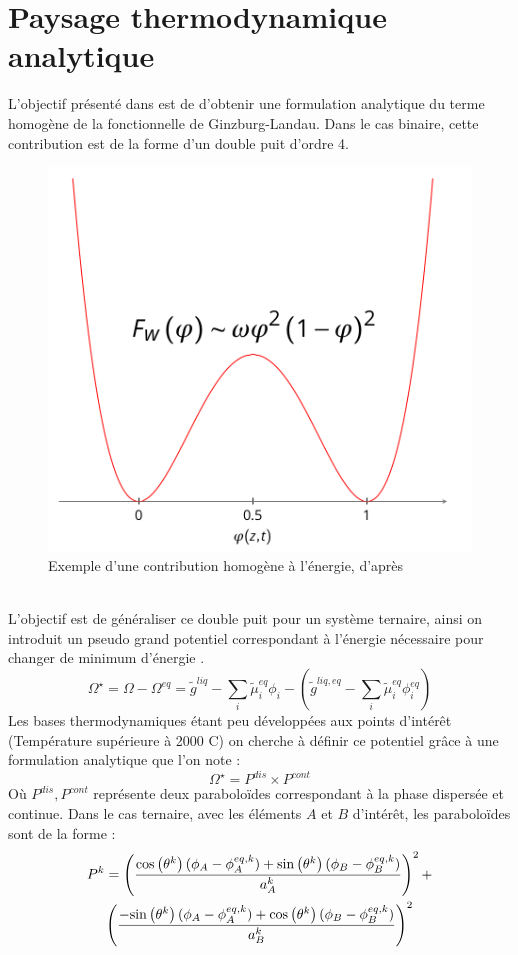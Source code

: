 \section{Paysage thermodynamique analytique}
L'objectif présenté dans \cite{noauthor_numerical_nodate} est de d'obtenir une formulation analytique du terme homogène de la fonctionnelle de Ginzburg-Landau. Dans le cas binaire, cette contribution est de la forme d'un double puit d'ordre 4.
\begin{figure}[h!]
	\centering
	\includegraphics[width=0.4\linewidth]{figure/DP}
	\caption[Exemple d'une contribution homogène à l'énergie]{Exemple d'une contribution homogène à l'énergie, d'après \cite{introini_suivi_nodate}}
	\label{fig:dp}
\end{figure}\\
L'objectif est de généraliser ce double puit pour un système ternaire, ainsi on introduit un pseudo grand potentiel correspondant à l'énergie nécessaire pour changer de minimum d'énergie \cite{cardon_modelisation_2016}.
\begin{equation}
\Omega^{\star} =\Omega - \Omega^{eq} =  \tilde{g}^{liq} - \sum_i \tilde{\mu}_i^{eq}\phi_i - \left(  \tilde{g}^{liq,eq} -  \sum_i \tilde{\mu}_i^{eq}\phi_i^{eq} \right) 
\end{equation}
Les bases thermodynamiques étant peu développées aux points d'intérêt (Température supérieure à 2000 \textdegree C) on cherche à définir ce potentiel grâce à une formulation analytique que l'on note :
\begin{equation}\label{double_puit}
	\Omega^{\star}  = P^{dis} \times P^{cont}
\end{equation}
Où $P^{dis}, P^{cont}$ représente deux paraboloïdes correspondant à la phase dispersée et continue. Dans le cas ternaire, avec les éléments $A$ et $B$ d'intérêt, les paraboloïdes sont de la forme : 
\begin{multline}
	P^{k}=\left(\frac{\text{cos}\left(\theta^{k}\right)(\phi_{A}-\phi_{A}^{eq,k}) + \text{sin}\left(\theta^{k}\right)(\phi_{B}-\phi_{B}^{eq,k})}{a_{A}^{k}}\right)^{2}+\\ \left(\frac{-\text{sin}\left(\theta^{k}\right)(\phi_{A}-\phi_{A}^{eq,k}) + \text{cos}\left(\theta^{k}\right)(\phi_{B}-\phi_{B}^{eq,k})}{a_{B}^{k}}\right)^{2}
	\label{eq:paraboloid_general_}
\end{multline} 
